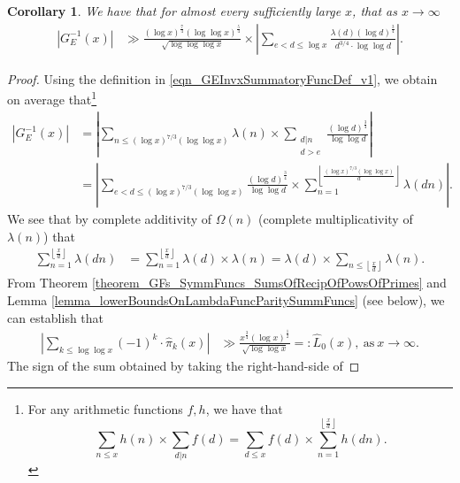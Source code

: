 \documentclass[11pt,reqno,a4letter]{article}
\numberwithin{figure}{section}
\numberwithin{table}{section}
\newcommand{\cf}{\textit{cf.\ }}
\newcommand{\Floor}[2]{\ensuremath{\left\lfloor \frac{#1}{#2} \right\rfloor}}
\theoremstyle{plain}
\newtheorem{cor}[theorem]{Corollary}
\numberwithin{theorem}{section}
\theoremstyle{definition}
\newcommand{\NBRef}[1]{}
\begin{document}
\begin{cor} 
\label{cor_ASemiForm_ForGInvx_v1} 
We have that for almost every sufficiently large $x$, that as $x \rightarrow \infty$ 
\begin{align*} 
\left\lvert G_E^{-1}(x) \right\rvert & \gg 
     \frac{(\log x)^{\frac{7}{4}} (\log\log x)^{\frac{5}{4}}}{ 
     \sqrt{\log\log\log x}} \times 
     \left\lvert \sum_{e < d \leq \log x} 
     \frac{\lambda(d) (\log d)^{\frac{3}{4}}}{d^{3/4} \cdot \log\log d} 
     \right\rvert. 
\end{align*} 
\end{cor} 
\NBRef{A10-2020.04-26} 
\begin{proof} 
Using the definition in \eqref{eqn_GEInvxSummatoryFuncDef_v1}, we obtain on average that\footnote{ 
     For any arithmetic functions $f,h$, we have that \cite[\cf \S 3.10; \S 3.12]{APOSTOLANUMT} 
     \[
     \sum_{n \leq x} h(n) \times \sum_{d|n} f(d) = \sum_{d \leq x} f(d) \times \sum_{n=1}^{\Floor{x}{d}} h(dn). 
     \] 
}
\begin{align*} 
\left\lvert G_E^{-1}(x) \right\rvert & = 
     \left\lvert \sum_{n \leq (\log x)^{7/3} (\log\log x)} \lambda(n) \times 
     \sum_{\substack{d|n \\ d > e}} \frac{(\log d)^{\frac{3}{4}}}{\log\log d} \right\rvert \\ 
     & = \left\lvert \sum_{e < d \leq (\log x)^{7/3} (\log\log x)} 
     \frac{(\log d)^{\frac{3}{4}}}{\log\log d} \times 
     \sum_{n=1}^{\Floor{(\log x)^{7/3} (\log\log x)}{d}} \lambda(dn) \right\rvert. 
\end{align*} 
We see that by complete additivity of $\Omega(n)$ 
(complete multiplicativity of $\lambda(n)$) that 
\begin{align*} 
\sum_{n=1}^{\Floor{x}{d}} \lambda(dn) & = \sum_{n=1}^{\Floor{x}{d}} \lambda(d) \times \lambda(n) 
     = \lambda(d) \times \sum_{n \leq \Floor{x}{d}} \lambda(n). 
\end{align*} 
From Theorem \ref{theorem_GFs_SymmFuncs_SumsOfRecipOfPowsOfPrimes} and 
Lemma \ref{lemma_lowerBoundsOnLambdaFuncParitySummFuncs} (see below), 
we can establish that 
\begin{align} 
\label{eqn_proof_tag_GEInvxLowerBound_v1} 
\left\lvert \sum_{k \leq \log\log x} (-1)^k \cdot \widehat{\pi}_k(x) \right\rvert 
     & \gg 
     \frac{x^{\frac{3}{4}} (\log x)^{\frac{1}{2}}}{\sqrt{\log\log x}} 
     =: \widehat{L}_0(x), \mathrm{\ as\ } x \rightarrow \infty. 
\end{align} 
The sign of the sum obtained by taking the right-hand-side of 

\end{proof}
\end{document}
